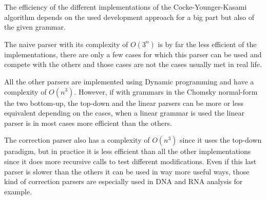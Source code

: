 The efficiency of the different implementations of the Cocke-Younger-Kasami algorithm depends on the used development approach for a big part but also of the given grammar.

The naive parser with its complexity of $O(3^n)$ is by far the less efficient of the implementations, there are only a few cases for which this parser can be used and compete with the others and those cases are not the cases usually met in real life.

All the other parsers are implemented using Dynamic programming and have a complexity of $O(n^3)$.
However, if with grammars in the Chomsky normal-form the two bottom-up, the top-down and the linear parsers can be more or less equivalent depending on the cases, when a linear grammar is used the linear parser is in most cases more efficient than the others.

The correction parser also has a complexity of $O(n^3)$ since it uses the top-down paradigm, but in practice it is less efficient than all the other implementations since it does more recursive calls to test different modifications.
Even if this last parser is slower than the others it can be used in way more useful ways, those kind of correction parsers are especially used in DNA and RNA analysis for example.
